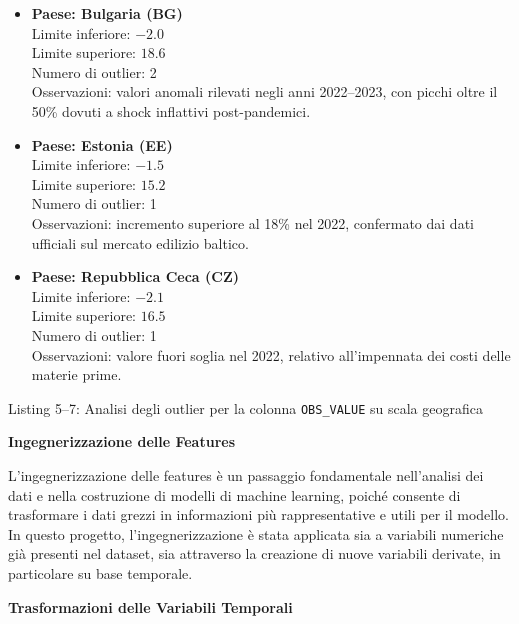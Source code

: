 \documentclass[conference]{IEEEtran}
\begin{document}
\begin{itemize}
\item\vspace{1em}\noindent \textbf{Paese: Bulgaria (BG)} \\ Limite inferiore: $-2.0$ \\ Limite superiore: $18.6$ \\ Numero di outlier: 2 \\ Osservazioni: valori anomali rilevati negli anni 2022–2023, con picchi oltre il 50\% dovuti a shock inflattivi post-pandemici.

\item\vspace{1em} \noindent \textbf{Paese: Estonia (EE)} \\ Limite inferiore: $-1.5$ \\ Limite superiore: $15.2$ \\ Numero di outlier: 1 \\ Osservazioni: incremento superiore al 18\% nel 2022, confermato dai dati ufficiali sul mercato edilizio baltico.

\item\vspace{1em} \noindent \textbf{Paese: Repubblica Ceca (CZ)} \\ Limite inferiore: $-2.1$ \\ Limite superiore: $16.5$ \\ Numero di outlier: 1 \\ Osservazioni: valore fuori soglia nel 2022, relativo all’impennata dei costi delle materie prime.
\end{itemize}

\begin{flushright} Listing 5–7: Analisi degli outlier per la colonna \texttt{OBS\_VALUE} su scala geografica \end{flushright}

\vspace{1em} \noindent\textbf{Ingegnerizzazione delle Features}

L’ingegnerizzazione delle features è un passaggio fondamentale nell’analisi dei dati e nella costruzione di modelli di machine learning, poiché consente di trasformare i dati grezzi in informazioni più rappresentative e utili per il modello. In questo progetto, l’ingegnerizzazione è stata applicata sia a variabili numeriche già presenti nel dataset, sia attraverso la creazione di nuove variabili derivate, in particolare su base temporale.

\vspace{1em} \noindent\textbf{Trasformazioni delle Variabili Temporali}
\end{document}
